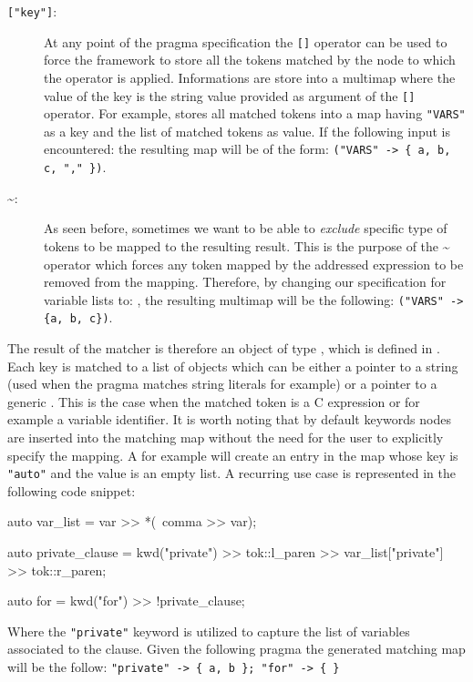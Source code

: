 \begin{description}
\item [{\tt["key"]}:] At any point of the pragma specification the {\tt []}
operator can be used to force the framework to store all the tokens matched by
the node to which the operator is applied. Informations are store into a
multimap where the value of the key is the string value provided as argument of
the {\tt []} operator. 
For example,  stores all matched
tokens into a map having {\tt "VARS"} as a key and the list of matched tokens as
value. If the following input is encountered:  the resulting
map will be of the form: {\tt ("VARS" -> \{ a, b, c, "," \})}. 

\item [\~{}:] As seen before, sometimes we want to be able to {\em exclude}
specific type of tokens to be mapped to the resulting result. This is the
purpose of the \~{} operator which forces any token mapped by the addressed
expression to be removed from the mapping. Therefore, by changing our
specification for variable lists to: , the resulting multimap will be the following:  {\tt ("VARS" ->
\{a, b, c\})}.

\end{description}

The result of the matcher is therefore an object of type
, which is defined in
. Each key is matched to a list of objects which
can be either a pointer to a string (used when the pragma matches string
literals for example) or a pointer to a generic . This is the
case when the matched token is a C expression or for example a variable
identifier. It is worth noting that by default keywords nodes are inserted into
the matching map without the need for the user to explicitly specify the
mapping. A  for example will create an entry in the map
whose key is {\tt "auto"} and the value is an empty list. A recurring use case
is represented in the following code snippet:

\begin{srcCode}
auto var_list = var >> *(~comma >> var);

auto private_clause = 
	kwd("private") >> tok::l_paren >> var_list["private"] >> tok::r_paren;

auto for = 
	kwd("for") >> !private_clause;
\end{srcCode}

Where the {\tt "private"} keyword is utilized to capture the list of variables
associated to the clause. Given the following pragma  the generated matching map will be the follow: {\tt "private" -> \{
a, b \}; "for" -> \{ \} }

